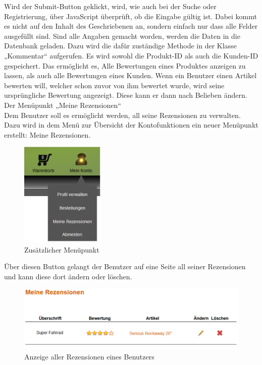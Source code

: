 Wird der Submit-Button geklickt, wird, wie auch bei der Suche oder Registrierung, über JavaScript überprüft, ob die Eingabe gültig ist. Dabei kommt es nicht auf den Inhalt des Geschriebenen an, sondern einfach nur dass alle Felder ausgefüllt sind. Sind alle Angaben gemacht worden, werden die Daten in die Datenbank geladen. Dazu wird die dafür zuständige Methode in der Klasse „Kommentar“ aufgerufen. Es wird sowohl die Produkt-ID als auch die Kunden-ID gespeichert. Das ermöglicht es, Alle Bewertungen eines Produktes anzeigen zu lassen, als auch alle Bewertungen eines Kunden. Wenn ein Benutzer einen  Artikel bewerten will, welcher schon zuvor von ihm bewertet wurde, wird seine ursprüngliche Bewertung angezeigt. Diese kann er dann nach Belieben ändern.
\\
Der Menüpunkt „Meine Rezensionen“
\\
Dem Benutzer soll es ermöglicht werden, all seine Rezensionen zu verwalten. Dazu wird in dem Menü zur Übersicht der Kontofunktionen ein neuer Menüpunkt erstellt: Meine Rezensionen. 

\begin{figure}[H]
\begin{center}
\includegraphics[width=4cm]{Bilder/Michael_Abbildung13-ZusaetzlicherMenuepunkt.png}
\end{center}
\caption{Zusätzlicher Menüpunkt}
\end{figure}

Über diesen Button gelangt der Benutzer auf eine Seite all seiner Rezensionen und kann diese dort ändern oder löschen.

\begin{figure}[H]
\begin{center}
\includegraphics[width=12cm]{Bilder/Michael_Abbildung14-AnzeigeAllerRezensionenEinesBenutzers.png}
\end{center}
\caption{Anzeige aller Rezensionen eines Benutzers}
\end{figure}

